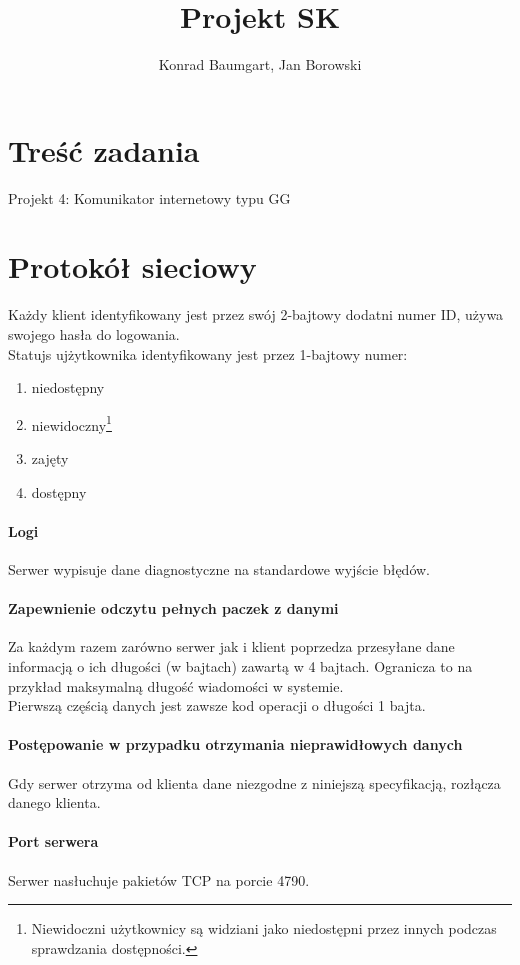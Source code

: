 \documentclass[10pt,a4paper]{article}
\author{Konrad Baumgart, Jan Borowski}
\title{Projekt SK}
\begin{document}
\maketitle

\section{Treść zadania}
	Projekt 4: Komunikator internetowy typu GG

\section{Protokół sieciowy}
	Każdy klient identyfikowany jest przez swój 2-bajtowy dodatni numer ID, używa swojego hasła do logowania.\\
	Statujs ujżytkownika identyfikowany jest przez 1-bajtowy numer:
	\begin{enumerate} 
		\itemsep0pt \parskip0pt 
		\setcounter{enumi}{-1}
		\item niedostępny
		\item niewidoczny\footnote{Niewidoczni użytkownicy są widziani jako
			niedostępni przez innych podczas sprawdzania dostępności.}
		\item zajęty
		\item dostępny
	\end{enumerate}
	
	\paragraph{Logi}
		Serwer wypisuje dane diagnostyczne na standardowe wyjście błędów.
	\paragraph{Zapewnienie odczytu pełnych paczek z danymi}
		Za każdym razem zarówno serwer jak i klient poprzedza przesyłane dane
		informacją o ich długości (w bajtach) zawartą w 4 bajtach. Ogranicza to na przykład maksymalną
		długość wiadomości w systemie.\\
		Pierwszą częścią danych jest zawsze kod operacji o długości 1 bajta.
	\paragraph{Postępowanie w przypadku otrzymania nieprawidłowych danych}
		Gdy serwer otrzyma od klienta dane niezgodne z niniejszą specyfikacją, rozłącza danego klienta.
	\paragraph{Port serwera} Serwer nasłuchuje pakietów TCP na porcie 4790.
\end{document}
